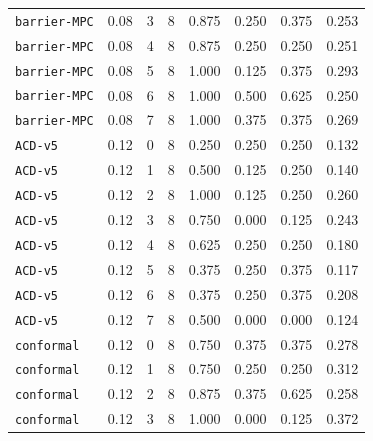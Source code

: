 \documentclass{article}
\begin{document}
\begin{center}
{\begin{tabular}{llllcccc}
\texttt{barrier-MPC} & 0.08 & 3 & 8 & 0.875 & 0.250 & 0.375 & 0.253 \\
\texttt{barrier-MPC} & 0.08 & 4 & 8 & 0.875 & 0.250 & 0.250 & 0.251 \\
\texttt{barrier-MPC} & 0.08 & 5 & 8 & 1.000 & 0.125 & 0.375 & 0.293 \\
\texttt{barrier-MPC} & 0.08 & 6 & 8 & 1.000 & 0.500 & 0.625 & 0.250 \\
\texttt{barrier-MPC} & 0.08 & 7 & 8 & 1.000 & 0.375 & 0.375 & 0.269 \\
\texttt{ACD-v5} & 0.12 & 0 & 8 & 0.250 & 0.250 & 0.250 & 0.132 \\
\texttt{ACD-v5} & 0.12 & 1 & 8 & 0.500 & 0.125 & 0.250 & 0.140 \\
\texttt{ACD-v5} & 0.12 & 2 & 8 & 1.000 & 0.125 & 0.250 & 0.260 \\
\texttt{ACD-v5} & 0.12 & 3 & 8 & 0.750 & 0.000 & 0.125 & 0.243 \\
\texttt{ACD-v5} & 0.12 & 4 & 8 & 0.625 & 0.250 & 0.250 & 0.180 \\
\texttt{ACD-v5} & 0.12 & 5 & 8 & 0.375 & 0.250 & 0.375 & 0.117 \\
\texttt{ACD-v5} & 0.12 & 6 & 8 & 0.375 & 0.250 & 0.375 & 0.208 \\
\texttt{ACD-v5} & 0.12 & 7 & 8 & 0.500 & 0.000 & 0.000 & 0.124 \\
\texttt{conformal} & 0.12 & 0 & 8 & 0.750 & 0.375 & 0.375 & 0.278 \\
\texttt{conformal} & 0.12 & 1 & 8 & 0.750 & 0.250 & 0.250 & 0.312 \\
\texttt{conformal} & 0.12 & 2 & 8 & 0.875 & 0.375 & 0.625 & 0.258 \\
\texttt{conformal} & 0.12 & 3 & 8 & 1.000 & 0.000 & 0.125 & 0.372 \\
\bottomrule
\end{tabular}%
}
\end{center}
\end{document}
